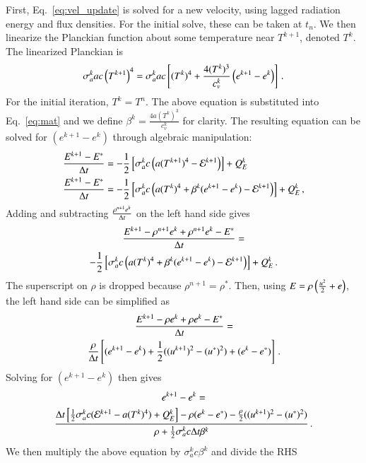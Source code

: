 First, Eq.~\eqref{eq:vel_update} is solved for a new velocity, using lagged
radiation energy and flux densities.  For the initial solve, these can be taken
at $t_n$.  We then linearize the Planckian function about some temperature near
$T^{k+1}$, denoted $T^k$. The linearized Planckian is
\begin{equation}
  \sigma_a^k a c \left( T^{k+1} \right)^4 = 
  \sigma_a^k a c \left[(T^k)^4 + \frac{4(T^k)^3}{c_v^k}\left(
  e^{k+1} - e^{k}  \right)\right] \, .
    \label{eq:linearize}
\end{equation}
For the initial iteration, $T^k=T^n$.  The above equation is substituted into
Eq.~\eqref{eq:mat} and we define $\beta^k=\frac{4a(T^k)^3}{c_v^k}$ for clarity.
The resulting equation can be solved for $(e^{k+1} - e^{k})$ through
algebraic manipulation:
\begin{align*}
   \frac{E^{k+1} - E^*}{\Delta t} &= - \frac{1}{2}\left[\sigma_a^k c \left(
   a(T^{k+1})^4 - \mathcal{E}^{k+1}\right)\right]+Q_E^k \\
   \frac{E^{k+1} - E^*}{\Delta t} &= - \frac{1}{2}\left[\sigma_a^k c \left(
   a(T^k)^4 + \beta^k(e^{k+1} - e^k)  - \mathcal{E}^{k+1}\right)\right]+Q_E^k \, ,
\end{align*}
Adding and subtracting $\frac{\rho^{n+1}e^k}{\Delta t}$ on the left hand side gives
\begin{multline*}
   \frac{E^{k+1}-\rho^{n+1} e^k + \rho^{n+1} e^k - E^*}{\Delta t} = \\
   -\frac{1}{2}\left[\sigma_a^{k}c\left(
   a(T^k)^4 + \beta^k(e^{k+1} - e^k)  - \mathcal{E}^{k+1}\right)\right]+Q_E^k \, .
\end{multline*}
The superscript on $\rho$ is dropped because $\rho^{n+1} = \rho^*$. Then, using
$E=\rho\left( \frac{u^2}{2} + e \right)$, the left hand side can be simplified as 
\begin{multline} 
   \frac{E^{k+1} - \rho e^k + \rho e^k - E^*}{\Delta t} =\\
   \frac{\rho}{\Delta t}\left[(e^{k+1} - e^{k}) + \frac{1}{2}((u^{k+1})^2-(u^*)^2) +
   (e^k-e^*) \right] \, .
\end{multline}
Solving for $(e^{k+1} - e^{k})$ then gives
\begin{multline}
    e^{k+1}-e^k=\\
    \frac{{\Delta t}\left[ \frac{1}{2}\sigma_a^k c (\mathcal{E}^{k+1} -
    a(T^k)^4)+Q_E^k \right]- \rho(e^k-e^*)-
    \frac{\rho}{2}((u^{k+1})^2-(u^*)^2)}
    {\rho +\frac{1}{2}\sigma_a^k c \Delta t\beta^k} \, .
\label{eq:energy_update}
\end{multline}
We then multiply the above equation by $\sigma_a^k c \beta^k$ and divide the RHS
